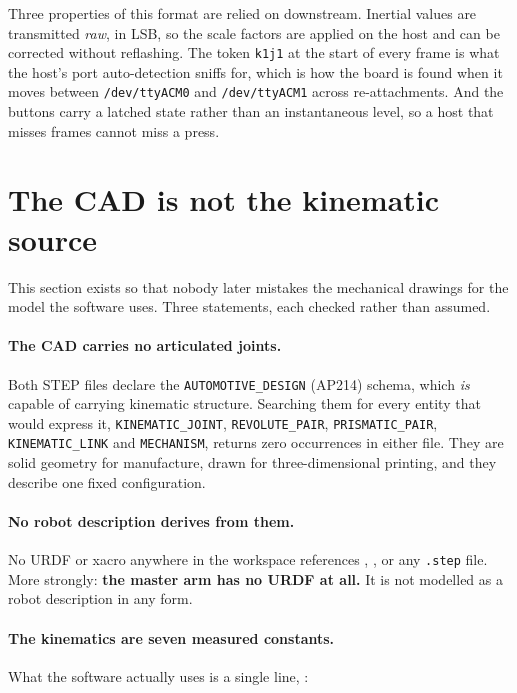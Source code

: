 Three properties of this format are relied on downstream. Inertial values are
transmitted \emph{raw}, in LSB, so the scale factors are applied on the host
and can be corrected without reflashing. The token \texttt{k1j1} at the start
of every frame is what the host's port auto-detection sniffs for, which is how
the board is found when it moves between \texttt{/dev/ttyACM0} and
\texttt{/dev/ttyACM1} across re-attachments. And the buttons carry a latched
state rather than an instantaneous level, so a host that misses frames cannot
miss a press.


\section{The CAD is not the kinematic source}
\label{sec:cad-not-source}
\label{sec:cad-not-kinematic}

This section exists so that nobody later mistakes the mechanical drawings for
the model the software uses. Three statements, each checked rather than
assumed.

\paragraph{The CAD carries no articulated joints.} Both STEP files declare the
\texttt{AUTOMOTIVE\_DESIGN} (AP214) schema, which \emph{is} capable of
carrying kinematic structure. Searching them for every entity that would
express it, \texttt{KINEMATIC\_JOINT}, \texttt{REVOLUTE\_PAIR},
\texttt{PRISMATIC\_PAIR}, \texttt{KINEMATIC\_LINK} and \texttt{MECHANISM},
returns zero occurrences in either file. They are solid geometry for
manufacture, drawn for three-dimensional printing, and they describe one fixed
configuration.

\paragraph{No robot description derives from them.} No URDF or xacro anywhere
in the workspace references , , or any
\texttt{.step} file. More strongly: \textbf{the master arm has no URDF at
all.} It is not modelled as a robot description in any form.

\paragraph{The kinematics are seven measured constants.} What the software
actually uses is a single line,
:

